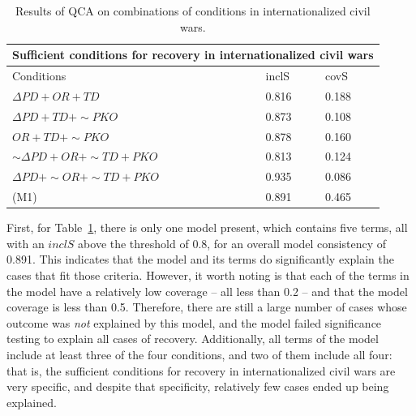 \documentclass{article}
\begin{document}
\begin{table}[ht]
    \centering
    \small
    \begin{tabular}{p{5cm} p{1.5cm} p{1.5cm}}
        \hline
        \multicolumn{3}{c}{Sufficient conditions for recovery in internationalized civil wars} \\
        \hline
        Conditions & inclS & covS \\
        \hline
        $\Delta PD + OR + TD$ & 0.816 & 0.188  \\
        $\Delta PD + TD + \sim PKO$ & 0.873 & 0.108  \\
        $OR + TD + \sim PKO$ & 0.878 & 0.160  \\
        $\sim\Delta PD + OR + \sim TD + PKO$ & 0.813 & 0.124  \\
        $\Delta PD + \sim OR + \sim TD + PKO$ & 0.935 & 0.086  \\
        \hline
        (M1) & 0.891 & 0.465 \\
        \hline
    \end{tabular}
    \caption{Results of QCA on combinations of conditions in internationalized civil wars.}
    \label{tab:sufficiency-intl}
\end{table}

First, for Table~\ref{tab:sufficiency-intl}, there is only one model present, which contains five terms, all with an $inclS$ above the threshold of 0.8, for an overall model consistency of 0.891. This indicates that the model and its terms do significantly explain the cases that fit those criteria. However, it worth noting is that each of the terms in the model have a relatively low coverage -- all less than 0.2 -- and that the model coverage is less than 0.5. Therefore, there are still a large number of cases whose outcome was \textit{not} explained by this model, and the model failed significance testing to explain all cases of recovery. Additionally, all terms of the model include at least three of the four conditions, and two of them include all four: that is, the sufficient conditions for recovery in internationalized civil wars are very specific, and despite that specificity, relatively few cases ended up being explained.
\end{document}
